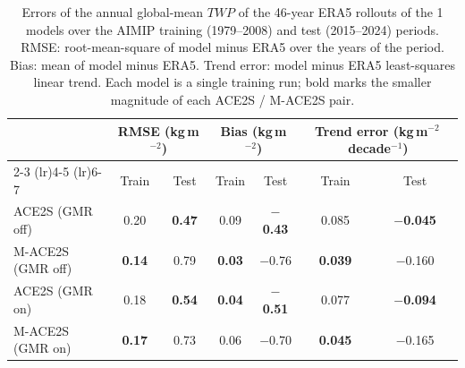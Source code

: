 \begin{table}[H]
  \caption{Errors of the annual global-mean $TWP$ of the 46-year ERA5 rollouts of the 1\textdegree{} models over the AIMIP training (1979--2008) and test (2015--2024) periods. RMSE: root-mean-square of model minus ERA5 over the years of the period. Bias: mean of model minus ERA5. Trend error: model minus ERA5 least-squares linear trend. Each model is a single training run; bold marks the smaller magnitude of each ACE2S / M-ACE2S pair.}
  \label{table:twp_trend_1deg}
  \centering
  \small
  \begin{tabular}{lcccccc}
    \toprule
     & \multicolumn{2}{c}{RMSE (kg\,m$^{-2}$)} & \multicolumn{2}{c}{Bias (kg\,m$^{-2}$)} & \multicolumn{2}{c}{Trend error (kg\,m$^{-2}$\,decade$^{-1}$)} \\
    \cmidrule(lr){2-3} \cmidrule(lr){4-5} \cmidrule(lr){6-7}
     & Train & Test & Train & Test & Train & Test \\
    \midrule
    ACE2S (GMR off) & 0.20 & \textbf{0.47} & 0.09 & \textbf{$-$0.43} & 0.085 & \textbf{$-$0.045} \\
    M-ACE2S (GMR off) & \textbf{0.14} & 0.79 & \textbf{0.03} & $-$0.76 & \textbf{0.039} & $-$0.160 \\
    \midrule
    ACE2S (GMR on) & 0.18 & \textbf{0.54} & \textbf{0.04} & \textbf{$-$0.51} & 0.077 & \textbf{$-$0.094} \\
    M-ACE2S (GMR on) & \textbf{0.17} & 0.73 & 0.06 & $-$0.70 & \textbf{0.045} & $-$0.165 \\
    \bottomrule
  \end{tabular}
\end{table}

